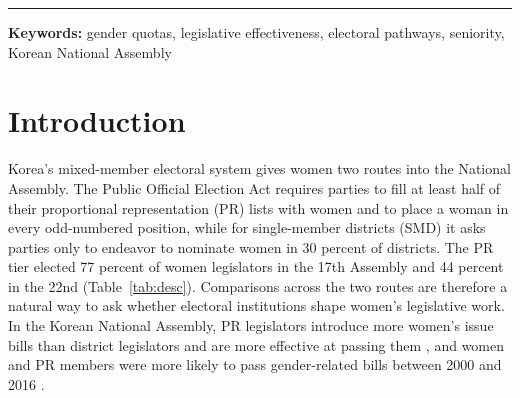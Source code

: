 \documentclass[11pt]{article}
\begin{document}
\noindent\rule{\linewidth}{0.6pt}

\begin{abstract}
\noindent Women elected in single-member districts (SMD) passed a larger share of their bills than women elected through proportional representation (PR) in the 21st and 22nd Korean National Assemblies (국회), the reverse of the pattern in the 17th through 20th. Version 1 of this paper attributed the reversal to seniority composition, arguing that the PR gender quota fills the list tier with first-term women while experienced women accumulate in districts. That argument rested on a member-file field that records each legislator's lifetime number of terms rather than the term served at each Assembly. With seniority measured at the Assembly, using 61,209 member bills of the 20th to 22nd Assemblies and 1,933 member-terms from the 17th on, the seniority explanation is not supported. PR women were almost all in a first term, but district women were most senior in the 20th Assembly, when PR women passed more of their bills, and only half of district women were beyond a first term in the 21st. Adding a multi-term indicator lowers the pathway interaction by about a tenth, reweighting accounts for about a quarter of the 21st Assembly gap and none of the 22nd, and in the 21st and 22nd Assemblies the gap among first-term women is about as large as among all women. Women who moved from a PR seat to a district seat show no change in passage that can be distinguished from the trend among other PR women. What produces the reversal remains unexplained.
\end{abstract}

\noindent\textbf{Keywords:} gender quotas, legislative effectiveness, electoral pathways, seniority, Korean National Assembly

\setcounter{page}{1}
\clearpage


\section{Introduction}

Korea's mixed-member electoral system gives women two routes into the National Assembly. The Public Official Election Act requires parties to fill at least half of their proportional representation (PR) lists with women and to place a woman in every odd-numbered position, while for single-member districts (SMD) it asks parties only to endeavor to nominate women in 30 percent of districts. The PR tier elected 77 percent of women legislators in the 17th Assembly and 44 percent in the 22nd (Table~\ref{tab:desc}). Comparisons across the two routes are therefore a natural way to ask whether electoral institutions shape women's legislative work. In the Korean National Assembly, PR legislators introduce more women's issue bills than district legislators and are more effective at passing them \citep{kweon2021}, and women and PR members were more likely to pass gender-related bills between 2000 and 2016 \citep{leelee2020}.
\end{document}
